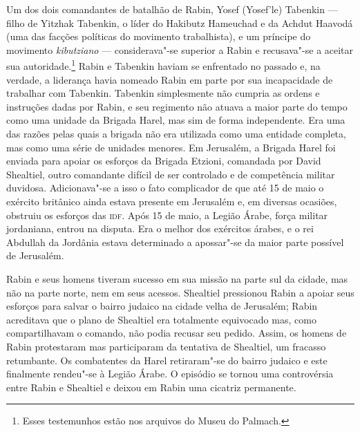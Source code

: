 Um dos dois comandantes de batalhão de Rabin, Yosef (Yosef'le) Tabenkin
--- filho de Yitzhak Tabenkin, o líder do Hakibutz Hameuchad e da Achdut
Haavodá (uma das facções políticas do movimento trabalhista), e um
príncipe do movimento \textit{kibutziano} --- considerava"-se superior a Rabin e
recusava"-se a aceitar sua autoridade.\footnote{Esses testemunhos estão nos arquivos do Museu do Palmach.} Rabin e Tabenkin haviam
se enfrentado no passado e, na verdade, a liderança havia nomeado Rabin
em parte por sua incapacidade de trabalhar com Tabenkin. Tabenkin
simplesmente não cumpria as ordens e instruções dadas por Rabin, e seu
regimento não atuava a maior parte do tempo como uma unidade da Brigada
Harel, mas sim de forma independente. Era uma das razões pelas quais a
brigada não era utilizada como uma entidade completa, mas como uma série
de unidades menores. Em Jerusalém, a Brigada Harel foi enviada para
apoiar os esforços da Brigada Etzioni, comandada por David Shealtiel,
outro comandante difícil de ser controlado e de competência militar
duvidosa. Adicionava"-se a isso o fato complicador de que até 15 de maio o
exército britânico ainda estava presente em Jerusalém e, em diversas
ocasiões, obstruiu os esforços das \textsc{idf}. Após 15 de maio, a Legião Árabe,
força militar jordaniana, entrou na disputa. Era o melhor dos exércitos
árabes, e o rei Abdullah da Jordânia estava determinado a apossar"-se da
maior parte possível de Jerusalém.

Rabin e seus homens tiveram sucesso em sua missão na parte sul da
cidade, mas não na parte norte, nem em seus acessos. Shealtiel
pressionou Rabin a apoiar seus esforços para salvar o bairro judaico na
cidade velha de Jerusalém; Rabin acreditava que o plano de Shealtiel era
totalmente equivocado mas, como compartilhavam o comando, não podia
recusar seu pedido. Assim, os homens de Rabin protestaram mas
participaram da tentativa de Shealtiel, um fracasso retumbante. Os
combatentes da Harel retiraram"-se do bairro judaico e este finalmente
rendeu"-se à Legião Árabe. O episódio se tornou uma
controvérsia entre Rabin e Shealtiel e deixou em Rabin uma cicatriz
permanente.

